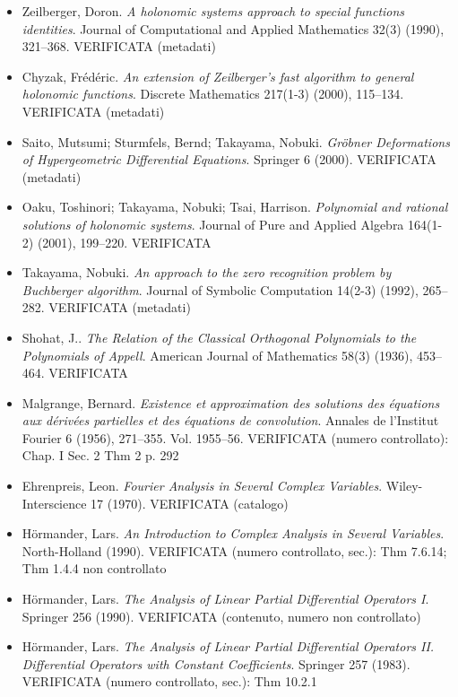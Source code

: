 \begin{itemize}[itemsep=2pt,leftmargin=1.2em,font=\small]
\item Zeilberger, Doron. \emph{A holonomic systems approach to special functions identities}. Journal of Computational and Applied Mathematics 32(3) (1990), 321--368. \textsf{\footnotesize VERIFICATA (metadati)}
\item Chyzak, Fr{\'e}d{\'e}ric. \emph{An extension of {Z}eilberger's fast algorithm to general holonomic functions}. Discrete Mathematics 217(1-3) (2000), 115--134. \textsf{\footnotesize VERIFICATA (metadati)}
\item Saito, Mutsumi; Sturmfels, Bernd; Takayama, Nobuki. \emph{Gr{\"o}bner Deformations of Hypergeometric Differential Equations}. Springer 6 (2000). \textsf{\footnotesize VERIFICATA (metadati)}
\item Oaku, Toshinori; Takayama, Nobuki; Tsai, Harrison. \emph{Polynomial and rational solutions of holonomic systems}. Journal of Pure and Applied Algebra 164(1-2) (2001), 199--220. \textsf{\footnotesize VERIFICATA}
\item Takayama, Nobuki. \emph{An approach to the zero recognition problem by {B}uchberger algorithm}. Journal of Symbolic Computation 14(2-3) (1992), 265--282. \textsf{\footnotesize VERIFICATA (metadati)}
\item Shohat, J.. \emph{The Relation of the Classical Orthogonal Polynomials to the Polynomials of {A}ppell}. American Journal of Mathematics 58(3) (1936), 453--464. \textsf{\footnotesize VERIFICATA}
\item Malgrange, Bernard. \emph{Existence et approximation des solutions des {\'e}quations aux d{\'e}riv{\'e}es partielles et des {\'e}quations de convolution}. Annales de l'Institut Fourier 6 (1956), 271--355. \textsf{\footnotesize Vol. 1955--56. VERIFICATA (numero controllato): Chap. I Sec. 2 Thm 2 p. 292}
\item Ehrenpreis, Leon. \emph{Fourier Analysis in Several Complex Variables}. Wiley-Interscience 17 (1970). \textsf{\footnotesize VERIFICATA (catalogo)}
\item H{\"o}rmander, Lars. \emph{An Introduction to Complex Analysis in Several Variables}. North-Holland (1990). \textsf{\footnotesize VERIFICATA (numero controllato, sec.): Thm 7.6.14; Thm 1.4.4 non controllato}
\item H{\"o}rmander, Lars. \emph{The Analysis of Linear Partial Differential Operators {I}}. Springer 256 (1990). \textsf{\footnotesize VERIFICATA (contenuto, numero non controllato)}
\item H{\"o}rmander, Lars. \emph{The Analysis of Linear Partial Differential Operators {II}. Differential Operators with Constant Coefficients}. Springer 257 (1983). \textsf{\footnotesize VERIFICATA (numero controllato, sec.): Thm 10.2.1}

\end{itemize}
